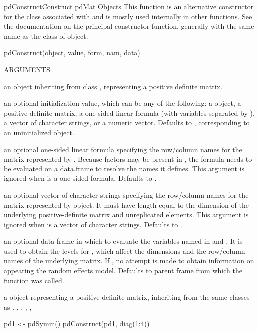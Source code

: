 \documentclass[pdftex]{article} \usepackage{url,graphicx}
\begin{document}
\begin{Helpfile}{pdConstruct}{Construct pdMat Objects}
This function is an alternative constructor for the 
class associated with  and is mostly used internally in other
functions. See the documentation on the principal constructor
function, generally with the same name as the  class of
object.
\begin{Example}
pdConstruct(object, value, form, nam, data)
\end{Example}
\begin{Argument}{ARGUMENTS}
\item[\Co{object:}]
an object inheriting from class , representing
a positive definite matrix.
\item[\Co{value:}]
an optional initialization value, which can be any of the
following: a  object, a positive-definite
matrix, a one-sided linear formula (with variables separated by
\Co{+}), a vector of character strings, or a numeric
vector. Defaults to , corresponding to an
uninitialized object.
\item[\Co{form:}]
an optional one-sided linear formula specifying the
row/column names for the matrix represented by . Because
factors may be present in , the formula needs to be
evaluated on a data.frame to resolve the names it defines. This
argument is ignored when  is a one-sided
formula. Defaults to .
\item[\Co{nam:}]
an optional vector of character strings specifying the
row/column names for the matrix represented by object. It must have 
length equal to the dimension of the underlying positive-definite
matrix and unreplicated elements. This argument is ignored when
 is a vector of character strings. Defaults to
.
\item[\Co{data:}]
an optional data frame in which to evaluate the variables
named in  and . It is used to
obtain the levels for , which affect the
dimensions and the row/column names of the underlying matrix. If
, no attempt is made to obtain information on 
 appearing the random effects model. Defaults to parent
frame from which the function was called.
\end{Argument}
a  object representing a positive-definite matrix,
inheriting from the same classes as .
, ,
, , 
\need 15pt
\vspace{-16pt} 
\begin{Example}
pd1 <- pdSymm()
pdConstruct(pd1, diag(1:4))
\end{Example}
\end{Helpfile}
\end{document}
